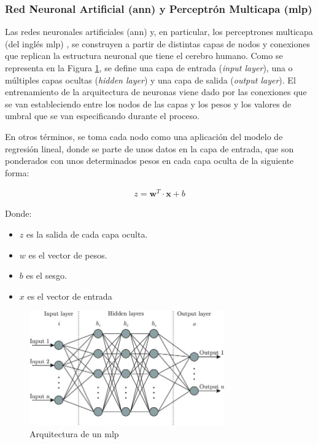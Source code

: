 \subsubsection{Red Neuronal Artificial (\acrshort{ann}) y Perceptrón Multicapa (\acrshort{mlp})}
\label{sec:dlann}

Las redes neuronales artificiales (\gls{ann}) y, en particular, los perceptrones multicapa (del inglés \gls{mlp}) \cite{ibmann}, se construyen a partir de distintas capas de nodos y conexiones que replican la estructura neuronal que tiene el cerebro humano. Como se representa en la Figura \ref{fig:ann}, se define una capa de entrada (\textit{input layer}), una o múltiples capas ocultas (\textit{hidden layer}) y una capa de salida (\textit{output layer}). El entrenamiento de la arquitectura de neuronas viene dado por las conexiones que se van estableciendo entre los nodos de las capas y los pesos y los valores de umbral que se van especificando durante el proceso. 

\vspace{3mm}

En otros términos, se toma cada nodo como una aplicación del modelo de regresión lineal, donde se parte de unos datos en la capa de entrada, que son ponderados con unos determinados pesos en cada capa oculta de la siguiente forma:

\begin{equation}
    \begin{aligned}
        z = \mathbf{w}^T \cdot \mathbf{x} + b
    \end{aligned}
\end{equation} 

Donde:
\begin{itemize}
    \renewcommand{\labelitemi}{}
    \item \(z\) es la salida de cada capa oculta. 
    \item \(w\) es el vector de pesos. 
    \item \(b\) es el sesgo.
    \item \(x\) es el vector de entrada
\end{itemize}

\vspace{3mm}

\begin{figure}[h!]
    \centering
    \includegraphics[width=0.75\textwidth]{img/teoria/ann.jpg}
    \caption{Arquitectura de un \acrshort{mlp} \cite{ann}}
    \label{fig:ann}
\end{figure}

